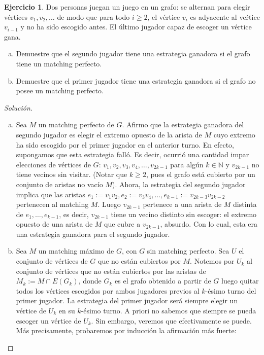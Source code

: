 \documentclass[12pt]{report}
\theoremstyle{plain}
\theoremstyle{definition}
\newtheorem{exercise}[theorem]{Ejercicio}
\newenvironment{solution}{\begin{proof}[Solución]}{\end{proof}}
\newcommand{\naturals}{\mathbb{N}}
\begin{document}
\begin{exercise}
Dos personas juegan un juego en un grafo: se alternan para elegir vértices $v_1,v_2, \ldots$ de modo que para todo $i \geq 2$, el vértice $v_i$ es adyacente al veŕtice $v_{i-1}$ y no ha sido escogido antes. El último jugador capaz de escoger un vértice gana.
\begin{enumerate}[(a)]
\item Demuestre que el segundo jugador tiene una estrategia ganadora si el grafo tiene un matching perfecto.
\item Demuestre que el primer jugador tiene una estrategia ganadora si el grafo no posee un matching perfecto.
\end{enumerate}
\end{exercise}
\begin{solution}
\begin{enumerate}[(a)]
\item Sea $M$ un matching perfecto de $G$. Afirmo que la estrategia ganadora del segundo jugador es elegir el extremo opuesto de la arista de $M$ cuyo extremo ha sido escogido por el primer jugador en el anterior turno. En efecto, supongamos que esta estrategia falló. Es decir, ocurrió una cantidad impar elecciones de vértices de $G$: $v_1, v_2, v_3, v_4, \ldots, v_{2k -1}$ para algún $k \in \naturals$ y $v_{2k-1}$ no tiene vecinos sin visitar. (Notar que $k \geq 2$, pues el grafo está cubierto por un conjunto de aristas no vacío $M$). Ahora, la estrategia del segundo jugador implica que las aristas $e_1 := v_1 v_2, e_2 := v_3 v_4 , \ldots, e_{k-1} := v_{2k-3} v_{2k-2}$ pertenecen al matching $M$. Luego $v_{2k-1}$ pertenece a una arista de $M$ distinta de $e_1, \ldots, e_{k-1}$, es decir, $v_{2k-1}$ tiene un vecino distinto sin escoger: el extremo opuesto de una arista de $M$ que cubre a $v_{2k-1}$, absurdo. Con lo cual, esta era una estrategia ganadora para el segundo jugador.

\item Sea $M$ un matching máximo de $G$, con $G$ sin matching perfecto. Sea $U$ el conjunto de vértices de $G$ que no están cubiertos por $M$. Notemos por $U_k$ al conjunto de vértices que no están cubiertos por las aristas de $M_k := M \cap E(G_k)$, donde $G_k$ es el grafo obtenido a partir de $G$ luego quitar todos los vértices escogidos por ambos jugadores previos al $k$-ésimo turno del primer jugador.
La estrategia del primer jugador será siempre elegir un vértice de $U_k$ en su $k$-ésimo turno. A priori no sabemos que siempre se pueda escoger un vértice de $U_k$. Sin embargo, veremos que efectivamente se puede. Más precisamente, probaremos por inducción la afirmación más fuerte:


\end{enumerate}
\end{solution}
\end{document}
